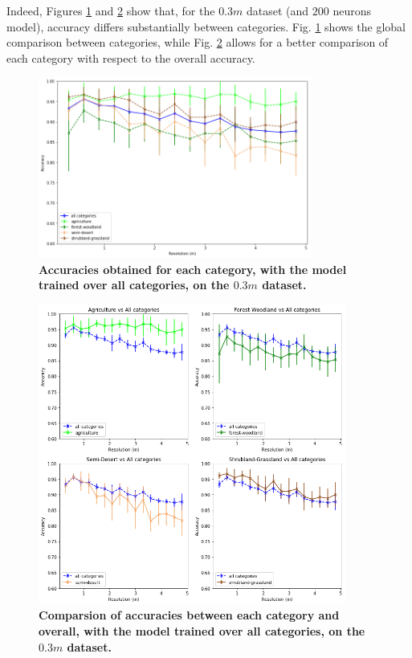 Indeed, Figures \ref{fig:acc_all_cat_03m} and \ref{fig:acc_by_cat_03m} show that, for the $0.3m$ dataset (and $200$ neurons model), accuracy differs substantially between categories. Fig. \ref{fig:acc_all_cat_03m} shows the global comparison between categories, while Fig. \ref{fig:acc_by_cat_03m} allows for a better comparison of each category with respect to the overall accuracy.

\begin{figure}[h!]
	\centering
	\includegraphics[width=0.8\textwidth]{Figures/results/acc_res_all_categories_03m.png}
	\captionsetup{width=1\linewidth}
	\caption{\textbf{Accuracies obtained for each category, with the model trained over all categories, on the $0.3m$ dataset.}}
	\label{fig:acc_all_cat_03m}
\end{figure}

\begin{figure}[h!]
	\centering
	\includegraphics[width=0.9\textwidth]{Figures/results/acc_res_by_category_03m.png}
	\captionsetup{width=1\linewidth}
	\caption{\textbf{Comparsion of accuracies between each category and overall, with the model trained over all categories, on the $0.3m$ dataset.}}
	\label{fig:acc_by_cat_03m}
\end{figure}

